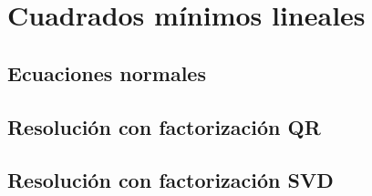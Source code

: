 \section{Cuadrados mínimos lineales}
\subsection{Ecuaciones normales}
\subsection{Resolución con factorización QR}
\subsection{Resolución con factorización SVD}
